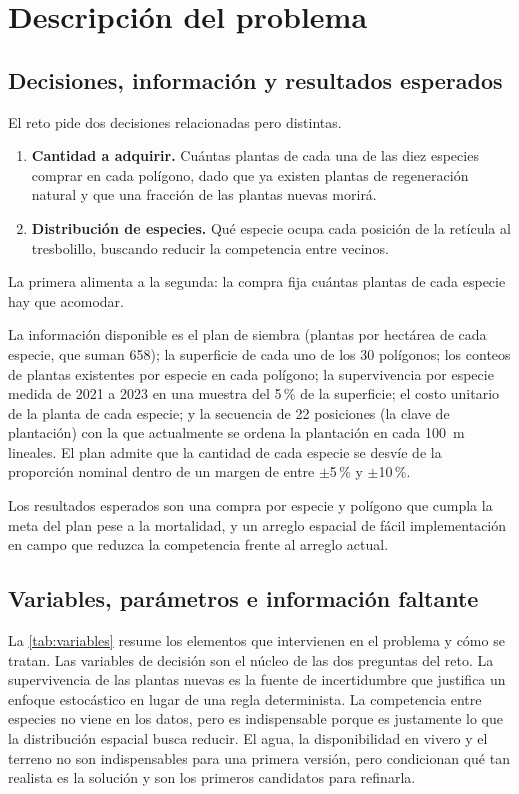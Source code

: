 \section{Descripción del problema}
\label{sec:problema}

\subsection{Decisiones, información y resultados esperados}
\label{subsec:decisiones}

El reto pide dos decisiones relacionadas pero distintas.
\begin{enumerate}
  \item \textbf{Cantidad a adquirir.} Cuántas plantas de cada una de las diez especies comprar en cada polígono, dado que ya existen plantas de regeneración natural y que una fracción de las plantas nuevas morirá.
  \item \textbf{Distribución de especies.} Qué especie ocupa cada posición de la retícula al tresbolillo, buscando reducir la competencia entre vecinos.
\end{enumerate}
La primera alimenta a la segunda: la compra fija cuántas plantas de cada especie hay que acomodar.

La información disponible es el plan de siembra (plantas por hectárea de cada especie, que suman 658); la superficie de cada uno de los 30 polígonos; los conteos de plantas existentes por especie en cada polígono; la supervivencia por especie medida de 2021 a 2023 en una muestra del 5\,\% de la superficie; el costo unitario de la planta de cada especie; y la secuencia de 22 posiciones (la clave de plantación) con la que actualmente se ordena la plantación en cada 100~m lineales. El plan admite que la cantidad de cada especie se desvíe de la proporción nominal dentro de un margen de entre $\pm$5\,\% y $\pm$10\,\%.

Los resultados esperados son una compra por especie y polígono que cumpla la meta del plan pese a la mortalidad, y un arreglo espacial de fácil implementación en campo que reduzca la competencia frente al arreglo actual.

\subsection{Variables, parámetros e información faltante}
\label{subsec:variables}

La \cref{tab:variables} resume los elementos que intervienen en el problema y cómo se tratan. Las variables de decisión son el núcleo de las dos preguntas del reto. La supervivencia de las plantas nuevas es la fuente de incertidumbre que justifica un enfoque estocástico en lugar de una regla determinista. La competencia entre especies no viene en los datos, pero es indispensable porque es justamente lo que la distribución espacial busca reducir. El agua, la disponibilidad en vivero y el terreno no son indispensables para una primera versión, pero condicionan qué tan realista es la solución y son los primeros candidatos para refinarla.

